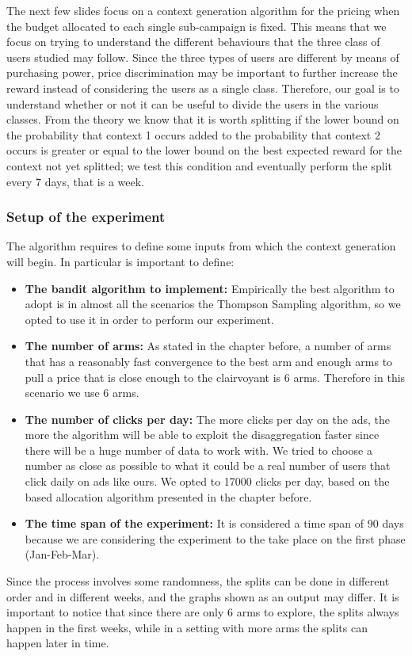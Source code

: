 The next few slides focus on a context generation algorithm for the pricing when the budget allocated to each single sub-campaign is fixed. This means that we focus on trying to understand the different behaviours that the three class of users studied may follow. Since the three types of users are different by means of purchasing power, price discrimination may be important to further increase the reward instead of considering the users as a single class. Therefore, our goal is to understand whether or not it can be useful to divide the users in the various classes. From the theory we know that it is worth splitting if the lower bound on the probability that context 1 occurs added to the probability that context 2 occurs is greater or equal to the lower bound on the best expected reward for the context not yet splitted; we test this condition and eventually perform the split every 7 days, that is a week.
\subsubsection{Setup of the experiment}
The algorithm requires to define some inputs from which the context generation will begin. In particular is important to define:
\begin{itemize}
	\item \textbf{The bandit algorithm to implement:} Empirically the best algorithm to adopt is in almost all the scenarios the Thompson Sampling algorithm, so we opted to use it in order to perform our experiment.
	\item \textbf{The number of arms:} As stated in the chapter before, a number of arms that has a reasonably fast convergence to the best arm and enough arms to pull a price that is close enough to the clairvoyant is 6 arms. Therefore in this scenario we use 6 arms.
	\item \textbf{The number of clicks per day:} The more clicks per day on the ads, the more the algorithm will be able to exploit the disaggregation faster since there will be a huge number of data to work with. We tried to choose a number as close as possible to what it could be a real number of users that click daily on ads like ours. We opted to 17000 clicks per day, based on the  based allocation algorithm presented in the chapter before.
	\item \textbf{The time span of the experiment:} It is considered a time span of 90 days because we are considering the experiment to the take place on the first phase (Jan-Feb-Mar).
\end{itemize}
Since the process involves some randomness, the splits can be done in different order and in different weeks, and the graphs shown as an output may differ. It is important to notice that since there are only 6 arms to explore, the splits always happen in the first weeks, while in a setting with more arms the splits can happen later in time.
